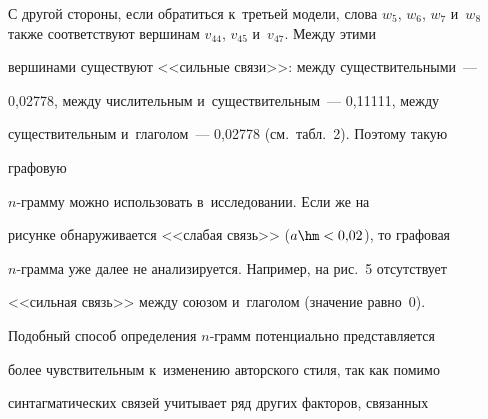   




    С другой стороны, если обратиться к~третьей модели, слова $w_5$, $w_6$, $w_7$ и~$w_8$ также соответствуют вершинам $v_{44}$, $v_{45}$ и~$v_{47}$. Между этими 


вершинами существуют <<сильные связи>>: между существительными~--- 


0,02778, между числительным и~существительным~--- 0,11111, между 


существительным и~глаголом~--- 0,02778 (см.\ табл.~2). Поэтому такую 


графовую %


$n$-грам\-му можно использовать в~исследовании. Если же на 


рисунке обнаруживается <<слабая связь>> ($a\hm< 0{,}02$), то графовая  


$n$-грам\-ма уже далее не анализируется. Например, на рис.~5 отсутствует 


<<сильная связь>> между союзом и~глаголом (значение равно~0).


  








  Подобный способ определения $n$-грамм потенциально представляется 


более чувствительным к~изменению авторского стиля, так как помимо 


синтагматических связей учитывает ряд других факторов, связанных 


